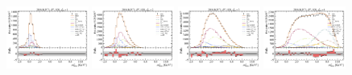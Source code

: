 \begin{figure}[!htb]
    \includegraphics[width=0.24\textwidth]{./figs-fit-fit-results/ctrl-fit/lines_q2_slices/fit_result-lines_q2_idx1-D0-1os-mmiss2.pdf}
    \includegraphics[width=0.24\textwidth]{./figs-fit-fit-results/ctrl-fit/lines_q2_slices/fit_result-lines_q2_idx2-D0-1os-mmiss2.pdf}
    \includegraphics[width=0.24\textwidth]{./figs-fit-fit-results/ctrl-fit/lines_q2_slices/fit_result-lines_q2_idx3-D0-1os-mmiss2.pdf}
    \includegraphics[width=0.24\textwidth]{./figs-fit-fit-results/ctrl-fit/lines_q2_slices/fit_result-lines_q2_idx4-D0-1os-mmiss2.pdf}


\end{figure}

